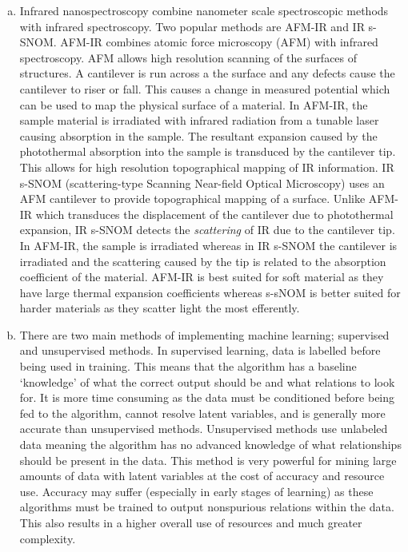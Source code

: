 \documentclass[titlepage]{article}
\begin{document}
\begin{enumerate}[a)]
    \item
    Infrared nanospectroscopy combine nanometer scale spectroscopic methods with infrared spectroscopy. 
    Two popular methods are AFM-IR and IR s-SNOM. AFM-IR combines atomic force microscopy (AFM)
    with infrared spectroscopy. AFM allows high resolution scanning of the surfaces of 
    structures. A cantilever is run across a the surface and any defects cause the cantilever 
    to riser or fall. This causes a change in measured potential which can be used to map the 
    physical surface of a material. In AFM-IR, the sample material is irradiated with infrared 
    radiation from a tunable laser causing absorption in the sample. The resultant expansion 
    caused by the photothermal absorption into the sample is transduced by the cantilever tip. 
    This allows for high resolution topographical mapping of IR information. IR s-SNOM (scattering-type Scanning Near-field Optical Microscopy) uses an AFM cantilever to provide topographical 
    mapping of a surface. Unlike AFM-IR which transduces the displacement of the cantilever 
    due to photothermal expansion, IR s-SNOM detects the \emph{scattering} of IR due to 
    the cantilever tip. In AFM-IR, the sample is irradiated whereas in IR s-SNOM the cantilever is 
    irradiated and the scattering caused by the tip is related to the absorption 
    coefficient of the material. AFM-IR is best suited for soft material 
    as they have large thermal expansion coefficients whereas s-sNOM is 
    better suited for harder materials as they scatter light the most efferently.
    
    \item
    There are two main methods of implementing machine learning; supervised and unsupervised 
    methods. In supervised learning, data is labelled before being used in training. 
    This means that the algorithm has a baseline `knowledge' of what the correct output 
    should be and what relations to look for. It is more time consuming as the data must be conditioned
    before being fed to the algorithm, cannot resolve latent variables, and is generally 
    more accurate than unsupervised methods. Unsupervised methods use unlabeled data 
    meaning the algorithm has no advanced knowledge of what relationships should be present in the 
    data. This method is very powerful for mining large amounts of data with latent variables at the cost
    of accuracy and resource use. Accuracy may suffer (especially in early stages of learning) as these algorithms
    must be trained to output nonspurious relations within the data. This also results in a higher overall 
    use of resources and much greater complexity. 
\end{enumerate}
\end{document}
